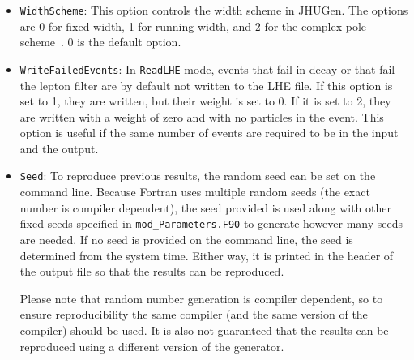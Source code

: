 \documentclass[aps,superscriptaddress,nofootinbib]{revtex4}
\newcommand{\eg}{e.g.~}
\begin{document}
\begin{itemize}
\begin{itemize}
     \item $\pm8$: If the scheme number is positive, $\mu_{F,\,R} \propto \sqrt{q^2_{J}}+\sqrt{q^2_{H}}$, where $J$ is the more massive associated particle. If the scheme number is negative and the matrix element treats an associated particle as massive (\eg $t$ in $t+H$), $\mu_{F,\,R} \propto m_{J}+m_{H}$ for the most massive associated particle (same as option -7).  $-8$ is the default value for \verb|Process| 110, 111, 112 and 113. with scale multiplier $0.25$.
     \item $\pm9$: If the scheme number is positive, $\mu_{F,\,R} \propto \sqrt{q^2_{J}}$, where $J$ is the more massive associated particle. If the scheme number is negative and the matrix element treats an associated particle as massive (\eg $t$ in $t+H$), $\mu_{F,\,R} \propto m_{J}$.
     \end{itemize}
\item \verb|WidthScheme|: This option controls the width scheme in JHUGen. The options are 0 for fixed width, 1 for running width, and 2 for the complex pole scheme~\cite{Passarino:2010qk,Goria:2011wa}. 0 is the default option.
\item \verb|WriteFailedEvents|: In \verb|ReadLHE| mode, events that fail in decay or that fail the lepton filter are by default not written to the LHE file.  If this option is set to 1, they are written, but their weight is set to 0.  If it is set to 2, they are written with a weight of zero and with no particles in the event.  This option is useful if the same number of events are required to be in the input and the output.

\item \verb|Seed|: To reproduce previous results, the random seed can be set on the command line.  Because Fortran uses multiple random seeds (the exact number is compiler dependent), the seed provided is used along with other fixed seeds specified in \verb|mod_Parameters.F90| to generate however many seeds are needed.  If no seed is provided on the command line, the seed is determined from the system time.  Either way, it is printed in the header of the output file so that the results can be reproduced.

Please note that random number generation is compiler dependent, so to ensure reproducibility the same compiler (and the same version of the compiler) should be used.  It is also not guaranteed that the results can be reproduced using a different version of the generator.


\end{itemize}
\end{document}

